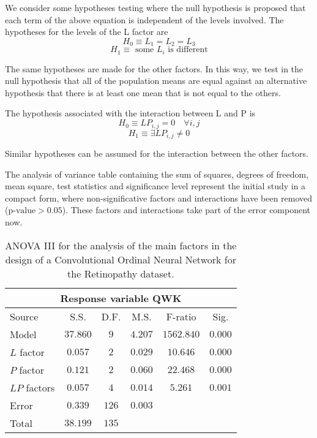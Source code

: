 \documentclass[journal]{IEEEtran}
\begin{document}
	We consider some hypotheses testing where the null hypothesis is proposed that each term of the above equation is independent of the levels involved. The hypotheses for the levels of the L factor are
	\[
	H_0 \equiv L_1 = L_2 = L_3
	\]
	\[
	H_1 \equiv \text{ some } L_i \text{ is different}
	\]
	
	The same hypotheses are made for the other factors. In this way, we test in the null hypothesis that all of the population means are equal against an alternative hypothesis that there is at least one mean that is not equal to the others.
	
	The hypothesis associated with the interaction between L and P is
	\[
	H_0 \equiv LP_{i,j} = 0 \quad \forall i,j
	\]
	\[
	H_1 \equiv \exists LP_{i,j} \ne 0
	\]
	
	Similar hypotheses can be assumed for the interaction between the other factors.
	
	The analysis of variance table containing the sum of squares, degrees of freedom, mean square, test statistics and significance level represent the initial study in a compact form, where non-significative factors and interactions have been removed ($\text{p-value} > 0.05$). These factors and interactions take part of the error component now.
	
	\begin{table}[!t]
		\caption{ANOVA III for the analysis of the main factors in the design of a Convolutional Ordinal Neural Network for the Retinopathy dataset.}
		\label{table:ANOVARetinopathy}
		\centering
		\small
		\begin{tabular}{l|ccccc}
			           \multicolumn{6}{c}{Response variable QWK}             \\ \hline
			Source       &   S.S.   & D.F.  &  M.S.   &  F-ratio   &  Sig.   \\ \hline
			Model        & $37.860$ &  $9$  & $4.207$ & $1562.840$ & $0.000$ \\
			$L$ factor   & $0.057$  &  $2$  & $0.029$ &  $10.646$  & $0.000$ \\
			$P$ factor   & $0.121$  &  $2$  & $0.060$ &  $22.468$  & $0.000$ \\
			$LP$ factors & $0.057$  &  $4$  & $0.014$ &  $5.261$   & $0.001$ \\
			Error        & $0.339$  & $126$ & $0.003$ &            &  \\ \hline
			Total        & $38.199$ & $135$ &         &            &
		\end{tabular}
	\end{table}
	
\end{document}
